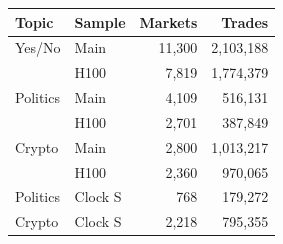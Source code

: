 \begin{tabular}{llrr}
\toprule
Topic & Sample & Markets & Trades \\
\midrule
Yes/No & Main & 11,300 & 2,103,188 \\
 & H100 & 7,819 & 1,774,379 \\
Politics & Main & 4,109 & 516,131 \\
 & H100 & 2,701 & 387,849 \\
Crypto & Main & 2,800 & 1,013,217 \\
 & H100 & 2,360 & 970,065 \\
\midrule
Politics & Clock S & 768 & 179,272 \\
Crypto & Clock S & 2,218 & 795,355 \\
\bottomrule
\end{tabular}
